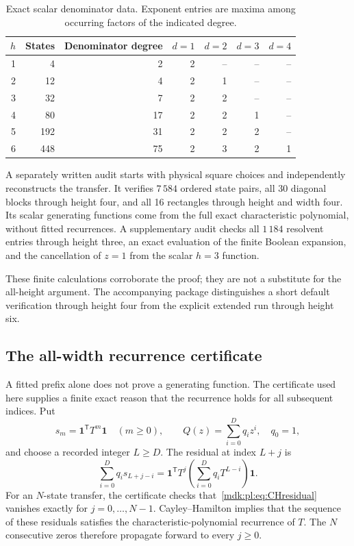 \documentclass[11pt,letterpaper]{article}
\numberwithin{equation}{section}
\theoremstyle{remark}\newtheorem{remark}[theorem]{Remark}
\newcommand{\one}{\mathbf 1}
\begin{document}
\begin{table}[ht]
\centering
\caption{Exact scalar denominator data. Exponent entries are maxima among occurring factors of the indicated degree.}\label{mdk:pl:tab:checks}
\begin{tabular}{@{}rrrrrrr@{}}
\toprule
$h$&States&Denominator degree&$d=1$&$d=2$&$d=3$&$d=4$\\
\midrule
1&4&2&2&--&--&--\\
2&12&4&2&1&--&--\\
3&32&7&2&2&--&--\\
4&80&17&2&2&1&--\\
5&192&31&2&2&2&--\\
6&448&75&2&3&2&1\\
\bottomrule
\end{tabular}
\end{table}

A separately written audit starts with physical square choices and independently reconstructs the transfer. It verifies $7\,584$ ordered state pairs, all 30 diagonal blocks through height four, and all 16 rectangles through height and width four. Its scalar generating functions come from the full exact characteristic polynomial, without fitted recurrences. A supplementary audit checks all $1\,184$ resolvent entries through height three, an exact evaluation of the finite Boolean expansion, and the cancellation of $z=1$ from the scalar $h=3$ function.

These finite calculations corroborate the proof; they are not a substitute for the all-height argument. The accompanying package distinguishes a short default verification through height four from the explicit extended run through height six.

\subsection{The all-width recurrence certificate}
A fitted prefix alone does not prove a generating function. The certificate used here supplies a finite exact reason that the recurrence holds for all subsequent indices. Put
\[
 s_m=\one^{\mathsf T}T^m\one\quad(m\ge0),\qquad
 Q(z)=\sum_{i=0}^{D}q_i z^i,\quad q_0=1,
\]
and choose a recorded integer $L\ge D$. The residual at index $L+j$ is
\begin{equation}\label{mdk:pl:eq:CHresidual}
 \sum_{i=0}^{D}q_i s_{L+j-i}
 =\one^{\mathsf T}T^j\left(\sum_{i=0}^{D}q_i T^{L-i}\right)\one.
\end{equation}
For an $N$-state transfer, the certificate checks that~\eqref{mdk:pl:eq:CHresidual} vanishes exactly for $j=0,\ldots,N-1$. Cayley--Hamilton implies that the sequence of these residuals satisfies the characteristic-polynomial recurrence of $T$. The $N$ consecutive zeros therefore propagate forward to every $j\ge0$.
\end{document}
